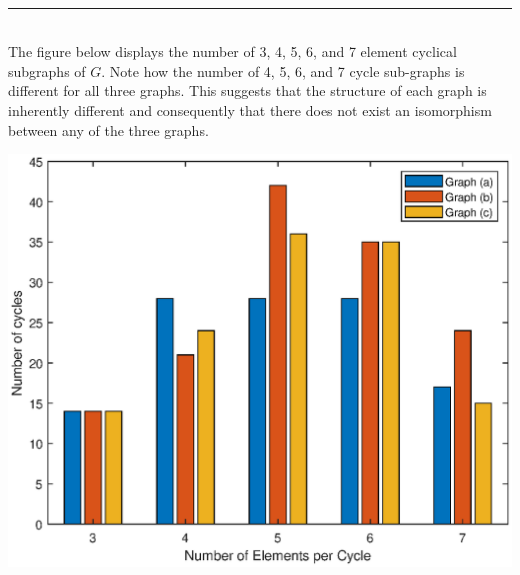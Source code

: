 \documentclass{article}
\newcommand{\statementsep}{\leavevmode\\[0.005in] \rule[\baselineskip/4]{\textwidth}{0.4pt}\leavevmode\\[0.005in]}
\begin{document}
\statementsep
The figure below displays the number of 3, 4, 5, 6, and 7 element cyclical subgraphs of $G$. Note how the number of 4, 5, 6, and 7 cycle sub-graphs is different for all three graphs.  This suggests that the structure of each graph is inherently different and consequently that there does not exist an isomorphism between any of the three graphs.
\begin{center}
	\includegraphics{media/graphComparison.eps}
\end{center}
\end{document}
